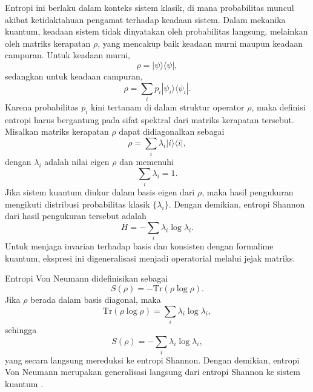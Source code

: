 Entropi ini berlaku dalam konteks sistem klasik, di mana probabilitas muncul akibat ketidaktahuan pengamat terhadap keadaan sistem. Dalam mekanika kuantum, keadaan sistem tidak dinyatakan oleh probabilitas langsung, melainkan oleh matriks kerapatan $\rho$, yang mencakup baik keadaan murni maupun keadaan campuran\cite{wilde_2017,rieffel2011quantum}. Untuk keadaan murni,
\begin{equation}
\rho = |\psi\rangle\langle\psi|,
\end{equation}
sedangkan untuk keadaan campuran,
\begin{equation}
\rho = \sum_i p_i |\psi_i\rangle\langle\psi_i|.
\end{equation}
Karena probabilitas $p_i$ kini tertanam di dalam struktur operator $\rho$, maka definisi entropi harus bergantung pada sifat spektral dari matriks kerapatan tersebut. Misalkan matriks kerapatan $\rho$ dapat didiagonalkan sebagai
\begin{equation}
\rho = \sum_i \lambda_i |i\rangle\langle i|,
\end{equation}
dengan $\lambda_i$ adalah nilai eigen $\rho$ dan memenuhi
\begin{equation}
\sum_i \lambda_i = 1.
\end{equation}
Jika sistem kuantum diukur dalam basis eigen dari $\rho$, maka hasil pengukuran mengikuti distribusi probabilitas klasik $\{\lambda_i\}$. Dengan demikian, entropi Shannon dari hasil pengukuran tersebut adalah
\begin{equation}
H = -\sum_i \lambda_i \log \lambda_i.
\end{equation}
Untuk menjaga invarian terhadap basis dan konsisten dengan formalime kuantum, ekspresi ini digeneralisasi menjadi operatorial melalui jejak matriks.
\par
Entropi Von Neumann didefinisikan sebagai
\begin{equation}
S(\rho) = -\mathrm{Tr}(\rho \log \rho).
\label{eq:vonNeumann}
\end{equation}
Jika $\rho$ berada dalam basis diagonal, maka
\begin{equation}
\mathrm{Tr}(\rho \log \rho) = \sum_i \lambda_i \log \lambda_i,
\end{equation}
sehingga
\begin{equation}
S(\rho) = -\sum_i \lambda_i \log \lambda_i,
\end{equation}
yang secara langsung mereduksi ke entropi Shannon. Dengan demikian, entropi Von Neumann merupakan generalisasi langsung dari entropi Shannon ke sistem kuantum \cite{wehrl1978general}.
